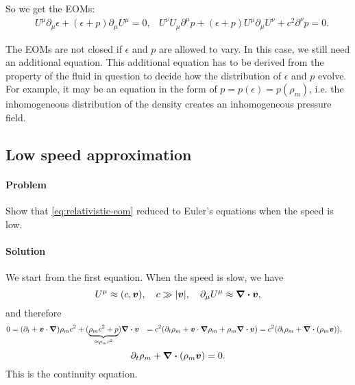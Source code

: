 \documentclass[hyperref, a4paper]{article}
\def\\{}%
\begin{document}
So we get the EOMs:
\begin{equation}
    \begin{aligned}
        &U^\mu \partial_\mu \epsilon + (\epsilon + p) \partial_\mu U^\mu = 0, \\
        &U^\nu U_\mu \partial^\mu p + (\epsilon + p) U^\mu \partial_\mu U^\nu + c^2 \partial^\nu p = 0.
    \end{aligned}
    \label{eq:relativistic-eom}
\end{equation}

The EOMs are not closed if $\epsilon$ and $p$ are allowed to vary. In this case, we still need an additional
equation. This additional equation has to be derived from the property of the fluid in question to decide 
how the distribution of $\epsilon$ and $p$ evolve. For example, it may be an equation in the form of 
$p = p (\epsilon) = p(\rho_m)$, i.e. the inhomogeneous distribution of the density creates an inhomogeneous
pressure field.

\subsection{Low speed approximation}

\paragraph{Problem} Show that \eqref{eq:relativistic-eom} reduced to Euler's equations when the speed is low.

\paragraph{Solution} We start from the first equation. When the speed is slow, we have 
\begin{equation}
    U^\mu \approx (c, \vb*{v}), \quad c \gg \abs{\vb*{v}}, \quad \partial_\mu U^\mu \approx \div{\vb*{v}},
\end{equation}
and therefore 
\[
    \begin{aligned}
        0 &= (\partial_t + \vb*{v} \cdot \grad ) \rho_m c^2 + (\underbrace{\rho_m c^2 + p}_{\approx \rho_m c^2}) \div{\vb*{v}} \\
        &= c^2 (\partial_t \rho_m + \vb*{v} \cdot \grad \rho_m + \rho_m \div{\vb*{v}}) \\
        &= c^2 (\partial_t \rho_m + \div{(\rho_m \vb*{v})}), 
    \end{aligned}
\]
\begin{equation}
    \partial_t \rho_m + \div{(\rho_m \vb*{v})} = 0.
\end{equation}
This is the continuity equation. 
\end{document}
